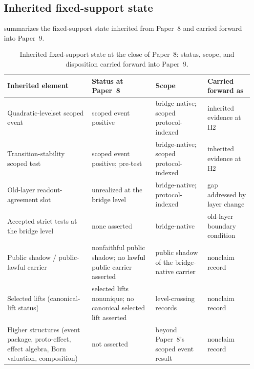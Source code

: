 \documentclass[11pt]{article}
\newcommand{\OldLayer}{H2}
\newcommand{\PaperNine}{Paper~9}
\newcommand{\PaperEight}{Paper~8}
\theoremstyle{definition}
\begin{document}
\subsection{Inherited fixed-support state}\label{subsec:inherited-state-table}

 summarizes the fixed-support state inherited from
\PaperEight{} and carried forward into \PaperNine{}.

\begin{table}[tbp]
  \centering
  \caption{Inherited fixed-support state at the close of \PaperEight{}: status, scope, and disposition carried forward into \PaperNine{}.}
  \label{tab:inherited-state}
  \small
  \begin{tabularx}{\textwidth}{@{}>{\raggedright\arraybackslash}p{}>{\raggedright\arraybackslash}X>{\raggedright\arraybackslash}p{}>{\raggedright\arraybackslash}p{}@{}}
    \toprule
    Inherited element & Status at \PaperEight{} & Scope & Carried forward as \\
    \midrule
    Quadratic-levelset scoped event
      & scoped event positive
      & bridge-native; scoped protocol-indexed
      & inherited evidence at \OldLayer{} \\
    Transition-stability scoped test
      & scoped event positive; pre-test
      & bridge-native; scoped protocol-indexed
      & inherited evidence at \OldLayer{} \\
    Old-layer readout-agreement slot
      & unrealized at the bridge level
      & bridge-native; protocol-indexed
      & gap addressed by layer change \\
    Accepted strict tests at the bridge level
      & none asserted
      & bridge-native
      & old-layer boundary condition \\
    Public shadow / public-lawful carrier
      & nonfaithful public shadow; no lawful public carrier asserted
      & public shadow of the bridge-native carrier
      & nonclaim record \\
    Selected lifts (canonical-lift status)
      & selected lifts nonunique; no canonical selected lift asserted
      & level-crossing records
      & nonclaim record \\
    Higher structures (event package, proto-effect, effect algebra, Born valuation, composition)
      & not asserted
      & beyond \PaperEight{}'s scoped event result
      & nonclaim record \\
    \bottomrule
  \end{tabularx}
\end{table}
 
\end{document}
